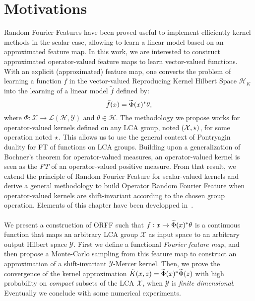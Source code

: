 
\section{Motivations}
\label{sec:motivations}
Random Fourier Features have been proved useful to implement efficiently kernel methods in the scalar case, allowing to learn a linear model based on an approximated feature map. In this work, we are interested to construct approximated operator-valued feature maps to learn vector-valued functions. With an explicit (approximated) feature map, one converts the problem of learning a function $f$ in the vector-valued Reproducing Kernel Hilbert Space $\mathcal{H}_K$ into the learning of a linear model $\tilde{f}$ defined by:
 \begin{dmath*}
 \tilde{f}(x) = \tildePhi{\omega}(x)^\adjoint  \theta,
 \end{dmath*}
 where $\Phi: \mathcal{X} \to \mathcal{L}(\mathcal{H},\mathcal{Y})$ and $\theta \in \mathcal{H}$. The methodology we propose works for operator-valued kernels defined on any \acf{LCA} group, noted ($\mathcal{X}, \star)$, for some operation noted $\star$. This allows us to use the general context of Pontryagin duality for \acl{FT} of functions on \acs{LCA} groups. Building upon a generalization of Bochner's theorem for operator-valued measures, an operator-valued kernel is seen as the \emph{\acl{FT}} of an operator-valued positive measure. From that result, we extend the principle of Random Fourier Feature for scalar-valued kernels and derive a general methodology to build Operator Random Fourier Feature when operator-valued kernels are shift-invariant according to the chosen group operation. Elements of this chapter have been developped in~\citet{brault2016random}.
\paragraph{}
We present a construction of \acf{ORFF} such that $f: x\mapsto \widetilde{\Phi}(x)^* \theta$ is a continuous function that maps an arbitrary \acs{LCA} group $\mathcal{X}$ as input space to an arbitrary output Hilbert space $\mathcal{Y}$. First we define a functional \emph{Fourier feature map}, and then propose a Monte-Carlo sampling from this feature map to construct an approximation of a shift-invariant $\mathcal{Y}$-Mercer kernel.
Then, we prove the convergence of the kernel approximation $\tilde{K}(x,z)=\widetilde{\Phi}(x)^* \widetilde{\Phi}(z)$ with high probability on \emph{compact} subsets of the \acs{LCA} $\mathcal{X}$, when $\mathcal{Y}$ is \emph{finite dimensional}. Eventually we conclude with some numerical experiments.

